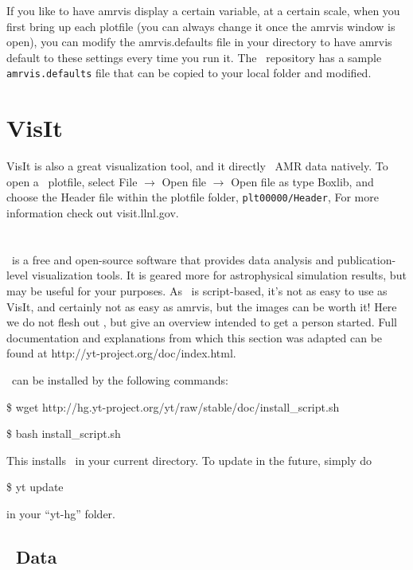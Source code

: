 If you like to have amrvis display a certain variable, at a certain
scale, when you first bring up each plotfile (you can always change it
once the amrvis window is open), you can modify the amrvis.defaults
file in your directory to have amrvis default to these settings every
time you run it. The \amrvis\ repository has a sample {\tt amrvis.defaults}
file that can be copied to your local folder and modified.


\section{VisIt}
VisIt is also a great visualization tool, and it directly \amrex\
AMR data natively.  To open a \amrex\ plotfile, select File
$\rightarrow$ Open file $\rightarrow$ Open file as type Boxlib, and
choose the Header file within the plotfile folder, {\tt plt00000/Header},
For more information check out visit.llnl.gov.

\section{\yt}
\yt\ is a free and open-source software that provides data analysis and
publication-level visualization tools.  It is geared more for astrophysical
simulation results, but may be useful for your purposes. As \yt\ is script-based, it's not
as easy to use as VisIt, and certainly not as easy as amrvis, but the
images can be worth it! Here we do not flesh out \yt, but give an
overview intended to get a person started. Full documentation and
explanations from which this section was adapted can be found at
http://yt-project.org/doc/index.html.

\yt\ can be installed by the following commands:

\$ wget http://hg.yt-project.org/yt/raw/stable/doc/install\_script.sh

\$ bash install\_script.sh

This installs \yt\ in your current directory. To update \yt in the
future, simply do

\$ yt update

in your ``yt-hg'' folder.

\subsection{\amrex\ Data}

